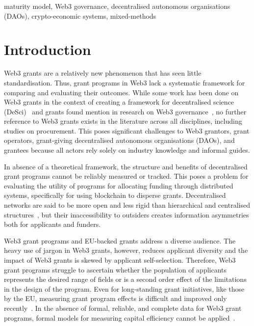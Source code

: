 \documentclass[conference]{IEEEtran}
\begin{document}
\begin{IEEEkeywords}
maturity model, Web3 governance, decentralised autonomous organisations (DAOs), crypto-economic systems, mixed-methods
\end{IEEEkeywords}

\section{Introduction}\label{sec_1}
Web3 grants are a relatively new phenomenon that has seen little standardisation. Thus, grant programs in Web3 lack a systematic framework for comparing and evaluating their outcomes. While some work has been done on Web3 grants in the context of creating a framework for decentralised science (DeSci)~\cite{ding_desci_2022} and grants found mention in research on Web3 governance~\cite{allen_exchange_2022}, no further reference to Web3 grants exists in the literature across all disciplines, including studies on procurement. This poses significant challenges to Web3 grantors, grant operators, grant-giving decentralised autonomous organisations (DAOs), and grantees because all actors rely solely on industry knowledge and informal guides.

In absence of a theoretical framework, the structure and benefits of decentralised grant programs cannot be reliably measured or tracked. This poses a problem for evaluating the utility of programs for allocating funding through distributed systems, specifically for using blockchain to disperse grants. Decentralised networks are said to be more open and less rigid than hierarchical and centralised structures~\cite{ding_desci_2022}, but their inaccessibility to outsiders creates information asymmetries both for applicants and funders.

Web3 grant programs and EU-backed grants address a diverse audience. The heavy use of jargon in Web3 grants, however, reduces applicant diversity and the impact of Web3 grants is skewed by applicant self-selection. Therefore, Web3 grant programs struggle to ascertain whether the population of applicants represents the desired range of fields or is a second order effect of the limitations in the design of the program. Even for long-standing grant initiatives, like those by the EU, measuring grant program effects is difficult and improved only recently~\cite{selebaj_effects_2021}. In the absence of formal, reliable, and complete data for Web3 grant programs, formal models for measuring capital efficiency cannot be applied~\cite{ odewole_capital_2020}.
\end{document}
